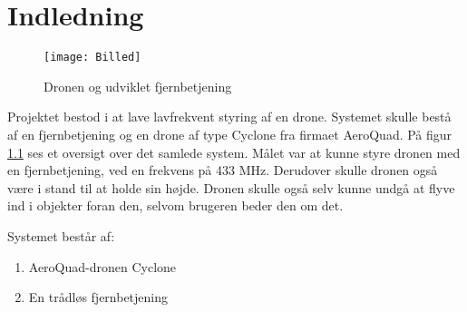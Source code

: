 \documentclass[Main]{subfiles}
\begin{document}
\chapter{Indledning}

\begin{figure}[H]
\centering
\texttt{[image: Billed]}
\caption{Dronen og udviklet fjernbetjening}
\label{Fig:Billed}
\end{figure}


Projektet bestod i at lave lavfrekvent styring af en drone.
Systemet skulle bestå af en fjernbetjening og en drone af type Cyclone fra firmaet AeroQuad. 
På figur \ref{Fig:Billed} ses et oversigt over det samlede system. 
Målet var at kunne styre dronen med en fjernbetjening, ved en frekvens på 433 MHz. 
Derudover skulle dronen også være i stand til at holde sin højde. 
Dronen skulle også selv kunne undgå at flyve ind i objekter foran den, selvom brugeren beder den om det.

Systemet består af:
\vspace{-10pt}
\begin{enumerate}
\item AeroQuad-dronen Cyclone
\item En trådløs fjernbetjening
\end{enumerate}
\end{document}
